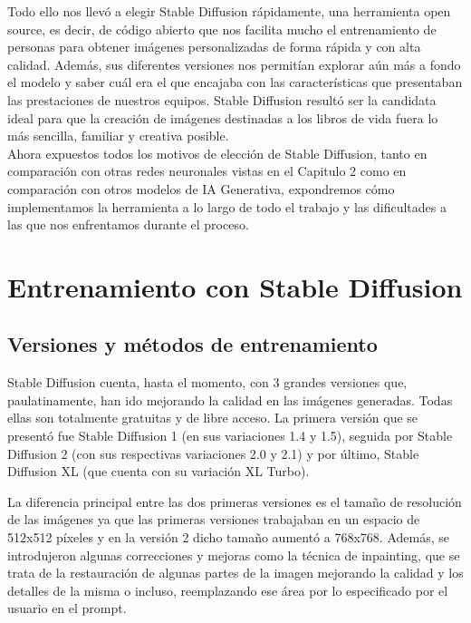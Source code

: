 Todo ello nos llevó a elegir Stable Diffusion rápidamente, una herramienta open source, es decir, de código abierto que nos facilita mucho el entrenamiento de personas para obtener imágenes personalizadas de forma rápida y con alta calidad. Además, sus diferentes versiones nos permitían explorar aún más a fondo el modelo y saber cuál era el que encajaba con las características que presentaban las prestaciones de nuestros equipos. Stable Diffusion resultó ser la candidata ideal para que la creación de imágenes destinadas a  los libros de vida fuera lo más sencilla, familiar y creativa posible. \\

Ahora expuestos todos los motivos de elección de Stable Diffusion, tanto en comparación con otras redes neuronales vistas en el Capitulo 2 como en comparación con otros modelos de IA Generativa, expondremos cómo implementamos la herramienta a lo largo de todo el trabajo y las dificultades a las que nos enfrentamos durante el proceso. \\

\section{Entrenamiento con Stable Diffusion}

\subsection{Versiones y métodos de entrenamiento}

Stable Diffusion cuenta, hasta el momento, con 3 grandes versiones que, paulatinamente, han ido mejorando la calidad en las imágenes generadas. Todas ellas son totalmente gratuitas y de libre acceso. La primera versión que se presentó fue Stable Diffusion 1 (en sus variaciones 1.4 y 1.5), seguida por Stable Diffusion 2 (con sus respectivas variaciones 2.0 y 2.1) y por último, Stable Diffusion XL (que cuenta con su variación XL Turbo). 

La diferencia principal entre las dos primeras versiones es el tamaño de resolución de las imágenes ya que las primeras versiones trabajaban en un espacio de 512x512 píxeles y en la versión 2 dicho tamaño aumentó a 768x768. Además, se introdujeron algunas correcciones y mejoras como la técnica de inpainting, que se trata de la restauración de algunas partes de la imagen mejorando la calidad y los detalles de la misma o incluso, reemplazando ese área por lo especificado por el usuario en el prompt.

